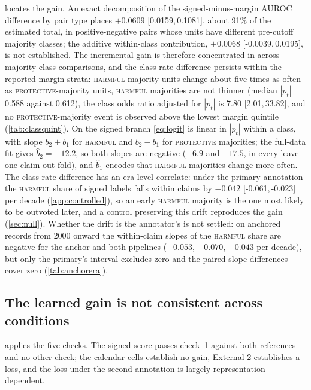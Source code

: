 \documentclass[11pt]{article}
\newcommand{\ci}[2]{[#1,\,#2]}
\begin{document}
 locates the gain. An exact decomposition of the signed-minus-margin AUROC
difference by pair type places $+0.0609$ \ci{0.0159}{0.1081}, about 91\% of the estimated total,
in positive-negative pairs whose units have different pre-cutoff majority classes; the additive
within-class contribution, $+0.0068$ \ci{-0.0039}{0.0195}, is not established. The incremental gain is therefore
concentrated in across-majority-class comparisons, and the class-rate difference persists within
the reported margin strata: \textsc{harmful}-majority units change about five times as often as
\textsc{protective}-majority units, \textsc{harmful} majorities are not thinner (median $|p_t|$ 0.588 against 0.612), the class odds
ratio adjusted for $|p_t|$ is 7.80 \ci{2.01}{33.82}, and no \textsc{protective}-majority event is
observed above the lowest margin quintile (\cref{tab:classquint}). On the signed branch
\cref{eq:logit} is linear in $|p_t|$ within a class, with slope $b_2+b_1$ for \textsc{harmful} and
$b_2-b_1$ for \textsc{protective} majorities; the full-data fit gives $\hat b_2=-12.2$, so both
slopes are negative ($-6.9$ and $-17.5$, in every leave-one-claim-out fold), and $\hat b_1$ encodes
that \textsc{harmful} majorities change more often. The class-rate difference has an era-level
correlate: under the primary annotation the \textsc{harmful} share of signed labels falls within
claims by $-0.042$ \ci{-0.061}{-0.023} per decade (\cref{app:controlled}), so an early
\textsc{harmful} majority is the one most likely to be outvoted later, and a control preserving this drift reproduces the gain (\cref{sec:null}).
Whether the drift is the annotator's is not settled: on anchored records from 2000 onward the
within-claim slopes of the \textsc{harmful} share are negative for the anchor and both pipelines
($-0.053$, $-0.070$, $-0.043$ per decade), but only the primary's interval excludes zero and the
paired slope differences cover zero (\cref{tab:anchorera}).

\subsection{The learned gain is not consistent across conditions}
\label{sec:transport}
 applies the five checks. The signed score passes check~1 against both
references and no other check; the calendar cells establish no gain, External-2 establishes a
loss, and the loss under the second annotation is largely representation-dependent.
\end{document}
